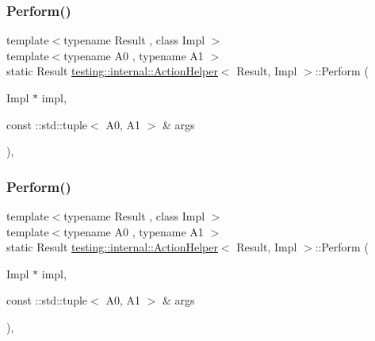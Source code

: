 \subsubsection{\texorpdfstring{Perform()}{Perform()}\hspace{0.1cm}{\footnotesize\ttfamily [5/33]}}
{\footnotesize\ttfamily template$<$typename Result , class Impl $>$ \\
template$<$typename A0 , typename A1 $>$ \\
static Result \mbox{\hyperlink{classtesting_1_1internal_1_1_action_helper}{testing\+::internal\+::\+Action\+Helper}}$<$ Result, Impl $>$\+::Perform (\begin{DoxyParamCaption}\item[{Impl $\ast$}]{impl,  }\item[{const \+::std\+::tuple$<$ A0, A1 $>$ \&}]{args }\end{DoxyParamCaption})\hspace{0.3cm}{\ttfamily [inline]}, {\ttfamily [static]}}

\mbox{\label{classtesting_1_1internal_1_1_action_helper_a71147b30081c44d7d2c776c1781b797c}} 
\subsubsection{\texorpdfstring{Perform()}{Perform()}\hspace{0.1cm}{\footnotesize\ttfamily [6/33]}}
{\footnotesize\ttfamily template$<$typename Result , class Impl $>$ \\
template$<$typename A0 , typename A1 $>$ \\
static Result \mbox{\hyperlink{classtesting_1_1internal_1_1_action_helper}{testing\+::internal\+::\+Action\+Helper}}$<$ Result, Impl $>$\+::Perform (\begin{DoxyParamCaption}\item[{Impl $\ast$}]{impl,  }\item[{const \+::std\+::tuple$<$ A0, A1 $>$ \&}]{args }\end{DoxyParamCaption})\hspace{0.3cm}{\ttfamily [inline]}, {\ttfamily [static]}}

\mbox{\label{classtesting_1_1internal_1_1_action_helper_a1f47357f6879b2517b60a3de30c2c634}} 
